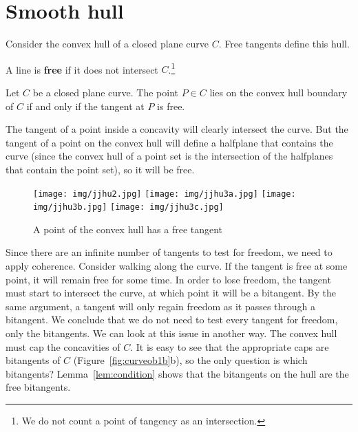 \documentclass[12pt]{article}
\begin{document}
\clearpage


\section{Smooth hull}
\label{sec:hull}

Consider the convex hull of a closed plane curve $C$.
Free tangents define this hull.

\begin{defn2}
A line is {\bf free} if it does not intersect $C$.\footnote{We do not count
	a point of tangency as an intersection.}
\end{defn2}

\begin{lemma}
\label{lem:condition}
Let $C$ be a closed plane curve.
The point $P \in C$ lies on the convex hull boundary of $C$ if and only if
the tangent at $P$ is free.
\end{lemma}
\prf
The tangent of a point inside a concavity will clearly
intersect the curve.
But the tangent of a point on the convex hull will define
a halfplane that contains the curve 
(since the convex hull of a point set is the intersection of the halfplanes 
that contain the point set),
so it will be free.
\QED

\begin{figure}[h]
\begin{center}
\texttt{[image: img/jjhu2.jpg]}
\texttt{[image: img/jjhu3a.jpg]}
\texttt{[image: img/jjhu3b.jpg]}
\texttt{[image: img/jjhu3c.jpg]}
\end{center}
\caption{A point of the convex hull has a free tangent}
\label{fig:tangent}
\end{figure}

Since there are an infinite number of tangents to test for freedom,
we need to apply coherence.
Consider walking along the curve.
If the tangent is free at some point,
it will remain free for some time.
In order to lose freedom, the tangent must start to intersect
the curve, at which point it will be a bitangent.
By the same argument, a tangent will only regain freedom
as it passes through a bitangent.
We conclude that we do not need to test every tangent for freedom,
only the bitangents.
We can look at this issue in another way.
The convex hull must cap the concavities of $C$.
It is easy to see that the appropriate caps are bitangents
of $C$ (Figure~\ref{fig:curveob1b}b), so the only question is which bitangents?
Lemma~\ref{lem:condition} shows that the bitangents on the hull
are the free bitangents.
\end{document}
